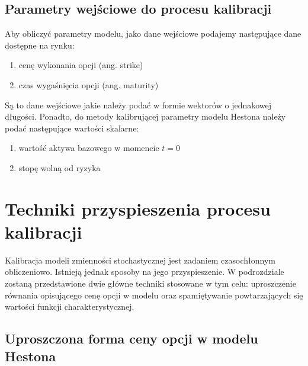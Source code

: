 \documentclass{pracamgr}
\begin{document}
\subsection{Parametry wejściowe do procesu kalibracji}

Aby obliczyć parametry modelu, jako dane wejściowe podajemy następujące dane dostępne na rynku:
\begin{enumerate}
  \item cenę wykonania opcji (ang. strike)
  \item czas wygaśnięcia opcji (ang. maturity)
\end{enumerate}
Są to dane wejściowe jakie należy podać w formie wektorów o jednakowej długości.
Ponadto, do metody kalibrującej parametry modelu Hestona należy podać następujące 
wartości skalarne:
\begin{enumerate}
  \item wartość aktywa bazowego w momencie $t=0$
  \item stopę wolną od ryzyka
\end{enumerate}

\section{Techniki przyspieszenia procesu kalibracji} %
Kalibracja modeli zmienności stochastycznej jest zadaniem czasochłonnym obliczeniowo. 
Istnieją jednak sposoby na jego przyspieszenie. W podrozdziale zostaną przedstawione 
dwie główne techniki stosowane w tym celu: uproszczenie równania opisującego cenę opcji 
w modelu oraz spamiętywanie powtarzających się wartości funkcji charakterystycznej.


\subsection{Uproszczona forma ceny opcji w modelu Hestona} %
\label{sec:numeryczne_wyznaczenie_warto_ci_funkcji_charakterystycznej}
\end{document}
